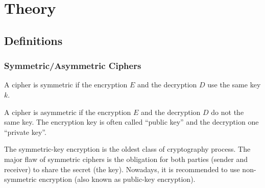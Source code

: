 \chapter{Theory}

\section{Definitions}


\subsection{Symmetric/Asymmetric Ciphers}

\begin{mydef}
\begin{minipage}[t]{0.8\textwidth}
    A cipher is symmetric if the encryption $E$ and the decryption $D$ use the same key $k$.
\end{minipage}
\end{mydef}

\begin{mydef}
\begin{minipage}[t]{0.8\textwidth}
    A cipher is asymmetric if the encryption $E$ and the decryption $D$ do not the same key. The encryption key is often called ``public key'' and the decryption one ``private key''.
\end{minipage}
\end{mydef}

The symmetric-key encryption is the oldest class of cryptography process. The major flaw of symmetric ciphers is the obligation for both parties (sender and receiver) to share the secret (the key). Nowadays, it is recommended to use non-symmetric encryption (also known as public-key encryption).




